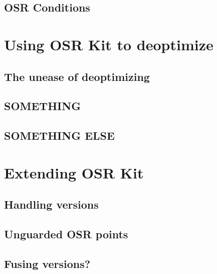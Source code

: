 \subsection{OSR Conditions}

\section{Using OSR Kit to deoptimize}
\subsection{The unease of deoptimizing}
\subsection{SOMETHING}
\subsection{SOMETHING ELSE}

\section{Extending OSR Kit}
\subsection{Handling versions}
\subsection{Unguarded OSR points}
\subsection{Fusing versions?}